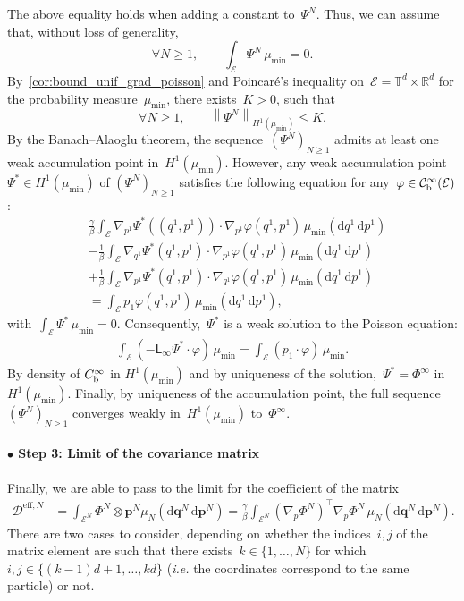 \documentclass[onefignum,onetabnum]{siamart251216} %
\renewcommand{\d}{\mathrm{d}}
\newcommand{\norm}[1]{\left\lVert#1\right\rVert}
\newcommand{\torus}{\mathbb T}
\newcommand{\real}{\mathbb R}
\newcommand{\mc}[1]{\mathcal{#1}}
\renewcommand{\leq}{\leqslant}
\renewcommand{\geq}{\geqslant}
\newcommand{\mescin}{\mu}
\newcommand{\DeffN}{\mc{D}^{\mathrm{eff},N}}
\newcommand{\genlin}{\mathsf{L}_\infty}
\newcommand{\vq}[1]{q^{#1}}
\newcommand{\vp}[1]{p^{#1}}
\newcommand{\vP}[1]{\mathbf{p}^{#1}}
\newcommand{\vQ}[1]{\mathbf{q}^{#1}}
\newcommand{\SolPois}{\Phi^\infty}
\theoremstyle{plain}
\numberwithin{equation}{section}
\numberwithin{theorem}{section}
\begin{document}
The above equality holds when adding a constant to~$\Psi^N$. Thus, we can assume that, without loss of generality,
\[
\forall N \geq 1,\qquad \int_{\mc{E}}\Psi^N\,\mescin_{\min} = 0.
\]
By~\cref{cor:bound_unif_grad_poisson} and Poincaré's inequality on~$\mc{E} = \torus^d \times \real^d$ for the probability measure~$\mescin_{\min}$, there exists~$K >0$, such that
\[
\forall N \geq 1,\qquad \norm{\Psi^N}_{H^1(\mescin_{\min})} \leq K.
\]
By the Banach--Alaoglu theorem, the sequence~$(\Psi^N)_{N\geq 1}$ admits at least one weak accumulation point in~$H^1(\mescin_{\min})$. However, any weak accumulation point~$\Psi^* \in H^1(\mescin_{\min})$ of $\left(\Psi^N\right)_{N\geq 1}$
satisfies the following equation for any~$\varphi \in \mc{C}_{\rm b}^\infty(\mc{E})$:
\begin{align*}
    &\frac{\gamma}{\beta}\int_{\mc{E}}\nabla_{p^1}\Psi^*((\vq{1},\vp{1})) \cdot \nabla_{p^1}\varphi(\vq{1},\vp{1})  \, \mescin_{\min}(\d\vq{1}\,\d\vp{1}) \\
    &-\frac{1}{\beta}\int_{\mc{E}}\nabla_{q^1}\Psi^*(\vq{1},\vp{1}) \cdot \nabla_{p^1}\varphi(\vq{1},\vp{1}) \, \mescin_{\min}(\d\vq{1}\,\d\vp{1})  \\
    & +\frac{1}{\beta}\int_{\mc{E}}\nabla_{p^1}\Psi^*(\vq{1},\vp{1})\cdot \nabla_{q^1}\varphi(\vq{1},\vp{1}) \, \mescin_{\min}(\d\vq{1}\,\d\vp{1}) \\
    &= \int_{\mc{E}} p_1 \varphi(\vq{1},\vp{1}) \, \mescin_{\min}(\d\vq{1}\,\d\vp{1}) ,
\end{align*}
with~$\int_{\mc{E}} \Psi^*\,\mescin_{\min} = 0$.
Consequently,~$\Psi^*$ is a weak solution to the Poisson equation:
    \begin{align*}
        \int_{\mc{E}}(-\genlin \Psi^* \cdot \varphi )\,\mescin_{\min} = \int_{\mc{E}} (p_1 \cdot \varphi )\, \mescin_{\min}.
    \end{align*}
By density of $C^{\infty}_{\rm b}$ in $H^1(\mescin_{\min})$ and by uniqueness of the solution,~$\Psi^* = \SolPois$ in~$H^1(\mescin_{\min})$.
Finally, by uniqueness of the accumulation point, the full sequence~$(\Psi^N)_{N\geq 1}$ converges weakly in~$H^1(\mescin_{\min})$ to~$\SolPois$.
\paragraph{$\bullet$ Step 3: Limit of the covariance matrix}
Finally, we are able to pass to the limit for the coefficient of the matrix
\begin{align*}
    \DeffN &= \int_{\mc{E}^N}\Phi^N \otimes \vP{N} \mu_N(\d \vQ{N} \, \d \vP{N}) = \frac{\gamma}{\beta}\int_{\mc{E}^N} (\nabla_p\Phi^N)^\top\nabla_p\Phi^N \,\mu_N(\d \vQ{N} \, \d \vP{N}).
\end{align*}
There are two cases to consider, depending on whether the indices~$i,j$ of the matrix element are such that there exists~$k\in\{1,\dots,N\}$ for which~$i,j\in\{(k-1)d +1 ,\dots,kd\}$ (\textit{i.e.} the coordinates correspond to the same particle) or not.
\end{document}
